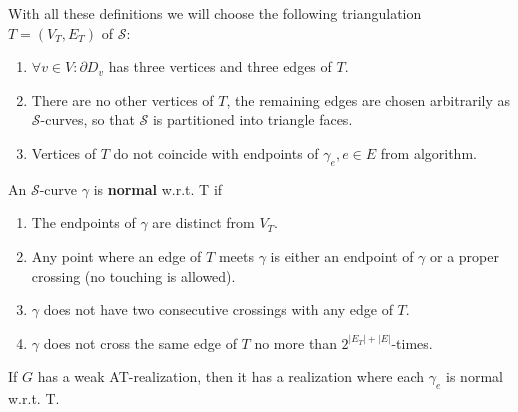 \noindent
With all these definitions we will choose the following triangulation $T = (V_T, E_T)$ of $\mathcal{S}$:

\begin{enumerate}
	\item $\forall v \in V: \partial D_v$ has three vertices and three edges of $T$.
	\item There are no other vertices of $T$, the remaining edges are chosen arbitrarily as $\mathcal{S}$-curves, so that $\mathcal{S}$ is partitioned into triangle faces.
	\item Vertices of $T$ do not coincide with endpoints of $\gamma_e, e \in E$ from algorithm.
\end{enumerate}

\begin{defn}
	An $\mathcal{S}$-curve $\gamma$ is \textbf{normal} w.r.t. T if
	
	\begin{enumerate}
		\item The endpoints of $\gamma$ are distinct from $V_T$.
		\item Any point where an edge of $T$ meets $\gamma$ is either an endpoint of $\gamma$ or a proper crossing (no touching is allowed).
		\item $\gamma$ does not have two consecutive crossings with any edge of $T$.
		\item $\gamma$ does not cross the same edge of $T$ no more than $2^{|E_T| + |E|}$-times.
	\end{enumerate}
\end{defn}

\begin{claim}
	If $G$ has a weak AT-realization, then it has a realization where each $\gamma_e$ is normal w.r.t. T.
\end{claim}

